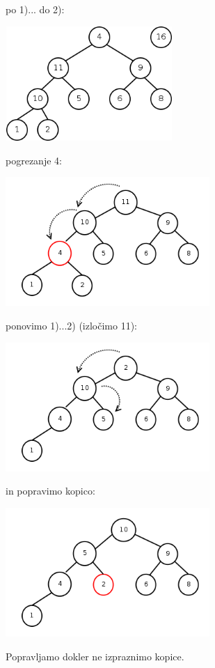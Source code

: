 \documentclass[a4paper,10pt]{article}
\begin{document}
\begin{flushleft}
po 1)... do 2): \\
	\begin{center}
	\includegraphics[width=6.36cm,height=4.35cm]{Slike/KopicaUrejanje1.png}
	\end{center}
pogrezanje 4:
	\begin{center}
	\includegraphics[width=7.75cm,height=4.9cm]{Slike/Pogrezanje4}
	\end{center}
ponovimo 1)...2) (izlo\v cimo 11):
	\begin{center}
	\includegraphics[width=7.75cm,height=4.9cm]{Slike/PokvarjenaKopica}
	\end{center}
in popravimo kopico:
	\begin{center}
	\includegraphics[width=7.75cm,height=4.9cm]{Slike/Pogrezanje2}
	\end{center}
\end{flushleft}
Popravljamo dokler ne izpraznimo kopice.
\end{document}
